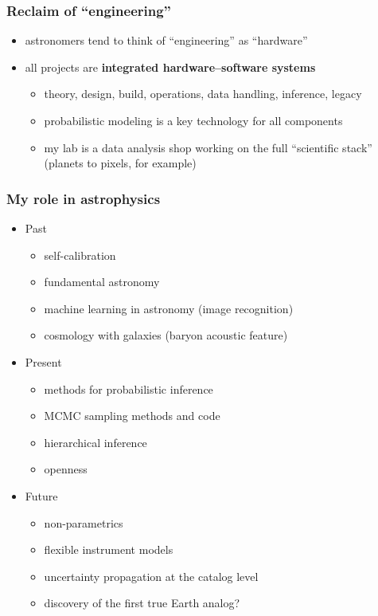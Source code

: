 \documentclass[aspectratio=169]{beamer}
\renewcommand{\emph}[1]{\textbf{#1}}
\begin{document}
\begin{frame}
  \frametitle{Reclaim of ``engineering''}
  \begin{itemize}
  \item astronomers tend to think of ``engineering'' as ``hardware''
  \item all projects are \emph{integrated hardware--software systems}
    \begin{itemize}
    \item theory, design, build, operations, data handling, inference, legacy
    \item probabilistic modeling is a key technology for all components
    \item my lab is a data analysis shop working on the full ``scientific stack'' (planets to pixels, for example)
    \end{itemize}
  \end{itemize}
\end{frame}

\begin{frame}
  \frametitle{My role in astrophysics}
  \begin{itemize}
  \item Past
    \begin{itemize}
    \item self-calibration
    \item fundamental astronomy
    \item machine learning in astronomy (image recognition)
    \item cosmology with galaxies (baryon acoustic feature)
    \end{itemize}
  \item Present
    \begin{itemize}
    \item methods for probabilistic inference
    \item MCMC sampling methods and code
    \item hierarchical inference
    \item openness
    \end{itemize}
  \item Future
    \begin{itemize}
    \item non-parametrics
    \item flexible instrument models
    \item uncertainty propagation at the catalog level
    \item discovery of the first true Earth analog?
    \end{itemize}
  \end{itemize}
\end{frame}
\end{document}
